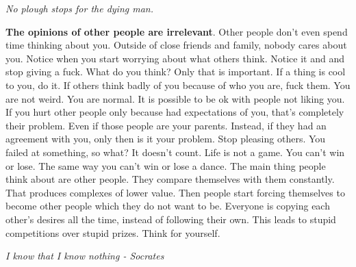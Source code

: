 \documentclass[a4paper,hidelinks]{article}
\begin{document}
\newpage

\begin{center}
\textit{
No plough stops for the dying man.
}
\end{center}

\textbf{The opinions of other people are irrelevant}.
Other people don't even spend time thinking about you.
Outside of close friends and family, nobody cares about you.
Notice when you start worrying about what others think.
Notice it and and stop giving a fuck.
What do you think?
Only that is important.
If a thing is cool to you, do it.
If others think badly of you because of who you are, fuck them.
You are not weird.
You are normal.
It is possible to be ok with people not liking you.
If you hurt other people only because had expectations of you, that's completely their problem.
Even if those people are your parents.
Instead, if they had an agreement with you, only then is it your problem.
Stop pleasing others.
You failed at something, so what?
It doesn't count.
Life is not a game.
You can't win or lose.
The same way you can't win or lose a dance.
The main thing people think about are other people.
They compare themselves with them constantly.
That produces complexes of lower value.
Then people start forcing themselves to become other people which they do not want to be.
Everyone is copying each other's desires all the time, instead of following their own.
This leads to stupid competitions over stupid prizes.
Think for yourself.

\newpage

\begin{center}
\textit{
I know that I know nothing - Socrates
}
\end{center}
\end{document}
